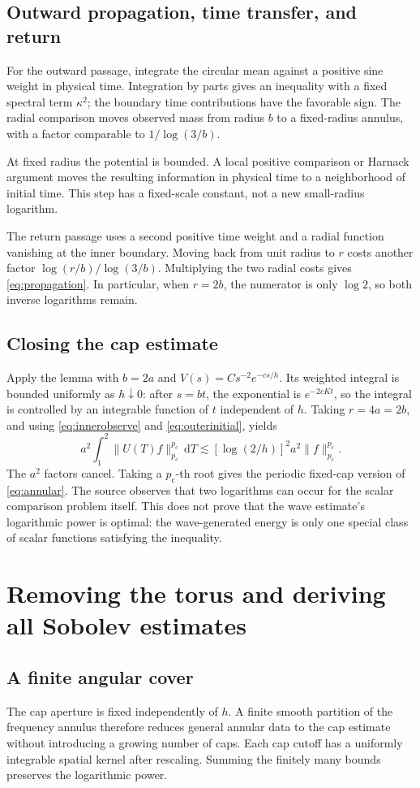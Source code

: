 \documentclass[11pt,a4paper]{article}
\numberwithin{equation}{section}
\theoremstyle{definition}
\theoremstyle{remark}
\newcommand{\dd}{\,\mathrm d}
\newcommand{\pc}{p_{\mathrm c}}
\begin{document}
\subsection{Outward propagation, time transfer, and return}
For the outward passage, integrate the circular mean against a positive
sine weight in physical time. Integration by parts gives an inequality with
a fixed spectral term $\kappa^2$; the boundary time contributions have the
favorable sign. The radial comparison moves observed mass from radius $b$
to a fixed-radius annulus, with a factor comparable to
$1/\log(3/b)$.

At fixed radius the potential is bounded. A local positive comparison or
Harnack argument moves the resulting information in physical time to a
neighborhood of initial time. This step has a fixed-scale constant, not a
new small-radius logarithm.

The return passage uses a second positive time weight and a radial function
vanishing at the inner boundary. Moving back from unit radius to $r$ costs
another factor $\log(r/b)/\log(3/b)$. Multiplying the two radial costs gives
\eqref{eq:propagation}. In particular, when $r=2b$, the numerator is only
$\log2$, so both inverse logarithms remain.

\subsection{Closing the cap estimate}
Apply the lemma with $b=2a$ and
$V(s)=Cs^{-2}e^{-cs/h}$. Its weighted integral is bounded uniformly as
$h\downarrow0$: after $s=bt$, the exponential is $e^{-2cKt}$, so the integral
is controlled by an integrable function of $t$ independent of $h$.
Taking $r=4a=2b$, and using \eqref{eq:innerobserve} and
\eqref{eq:outerinitial}, yields
\[
 a^2\int_1^2\|U(T)f\|_{\pc}^{\pc}\dd T
 \lesssim [\log(2/h)]^2 a^2\|f\|_{\pc}^{\pc}.
\]
The $a^2$ factors cancel. Taking a $\pc$-th root gives the periodic fixed-cap
version of \eqref{eq:annular}. The source observes that two logarithms can
occur for the scalar comparison problem itself. This does not prove that the
wave estimate's logarithmic power is optimal: the wave-generated energy is
only one special class of scalar functions satisfying the inequality.

\section{Removing the torus and deriving all Sobolev estimates}
\label{sec:transfer}
\subsection{A finite angular cover}
The cap aperture is fixed independently of $h$. A finite smooth partition
of the frequency annulus therefore reduces general annular data to the cap
estimate without introducing a growing number of caps. Each cap cutoff has a
uniformly integrable spatial kernel after rescaling. Summing the finitely many
bounds preserves the logarithmic power.
\end{document}
